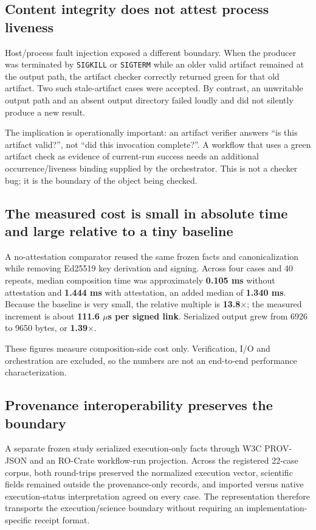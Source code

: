 \subsection{Content integrity does not attest process liveness}

Host/process fault injection exposed a different boundary. When the producer was
terminated by \texttt{SIGKILL} or \texttt{SIGTERM} while an older valid artifact
remained at the output path, the artifact checker correctly returned green for that
old artifact. Two such stale-artifact cases were accepted. By contrast, an
unwritable output path and an absent output directory failed loudly and did not
silently produce a new result.

The implication is operationally important: an artifact verifier answers
``is this artifact valid?'', not ``did this invocation complete?''. A workflow that
uses a green artifact check as evidence of current-run success needs an additional
occurrence/liveness binding supplied by the orchestrator. This is not a checker bug;
it is the boundary of the object being checked.

\subsection{The measured cost is small in absolute time and large relative to a tiny baseline}

A no-attestation comparator reused the same frozen facts and canonicalization while
removing Ed25519 key derivation and signing. Across four cases and 40 repeats, median
composition time was approximately \textbf{0.105 ms} without attestation and
\textbf{1.444 ms} with attestation, an added median of \textbf{1.340 ms}. Because the
baseline is very small, the relative multiple is \textbf{13.8$\times$}; the measured
increment is about \textbf{111.6 $\mu$s per signed link}. Serialized output grew from
6926 to 9650 bytes, or \textbf{1.39$\times$}.

These figures measure composition-side cost only. Verification, I/O and orchestration
are excluded, so the numbers are not an end-to-end performance characterization.

\subsection{Provenance interoperability preserves the boundary}

A separate frozen study serialized execution-only facts through W3C PROV-JSON and an
RO-Crate workflow-run projection. Across the registered 22-case corpus, both
round-trips preserved the normalized execution vector, scientific fields remained
outside the provenance-only records, and imported versus native execution-status
interpretation agreed on every case. The representation therefore transports the
execution/science boundary without requiring an implementation-specific receipt
format.

